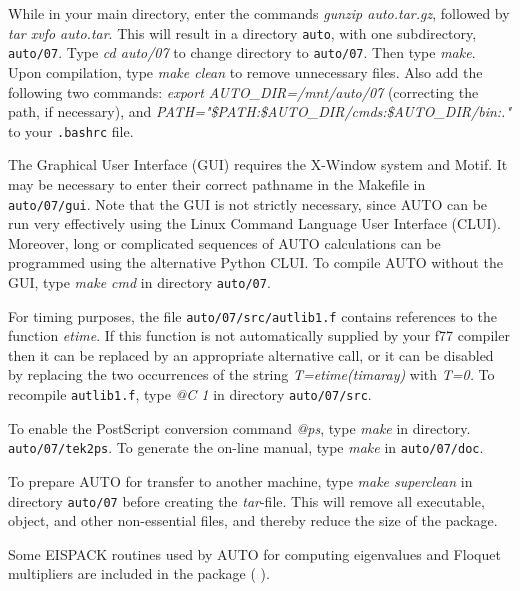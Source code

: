 \documentclass[12pt]{report}
\begin{document}
While in your main directory, enter the commands
{\it gunzip auto.tar.gz},
followed by
{\it tar xvfo auto.tar}.
This will result in a directory {\tt auto}, 
with one subdirectory, {\tt auto/07}. 
Type {\it cd auto/07}  
to change directory to {\tt auto/07}.
Then type {\it make}.  
Upon compilation, type 
{\it make clean}  
to remove unnecessary files.
Also add the following two commands:
{\it export AUTO\_DIR=/mnt/auto/07}
(correcting the path, if necessary), and
{\it PATH="\$PATH:\$AUTO\_DIR/cmds:\$AUTO\_DIR/bin:."}
to your {\tt .bashrc} file.

The Graphical User Interface (GUI) requires the {\cal X-Window} system
and {\cal Motif}.
It may be necessary to enter their correct pathname in the Makefile
in {\tt auto/07/gui}.
Note that the GUI is not strictly necessary, since {\cal AUTO} can be run very effectively using the Linux Command Language User Interface (CLUI).
Moreover, long or complicated sequences of {\cal AUTO} calculations can
be programmed using the alternative Python CLUI. 
To compile {\cal AUTO} without the GUI, type {\it make cmd} in directory 
{\tt auto/07}.

For timing purposes, the file {\tt auto/07/src/autlib1.f}
contains references to the function {\it etime}.
If this function is not automatically supplied by your f77 compiler then it can be 
replaced by an appropriate alternative call, or it can be disabled by replacing
the two occurrences of the string {\it T=etime(timaray)} with {\it T=0.}
To recompile {\tt autlib1.f}, type {\it @C 1} in directory {\tt auto/07/src}.

To enable the PostScript conversion command {\it @ps}, 
type {\it make} in directory.  {\tt auto/07/tek2ps}.
To generate the on-line manual, type {\it make} in {\tt auto/07/doc}.

To prepare {\cal AUTO} for transfer to another machine, type {\it make superclean}
in directory {\tt auto/07} before creating the {\it tar}-file. 
This will remove all executable, object, and other non-essential files, and
thereby reduce the size of the package.

Some {\cal EISPACK} routines used by {\cal AUTO} for computing eigenvalues and
Floquet multipliers are included in the package
( \citeyear{EISPACK:76}).
\end{document}
